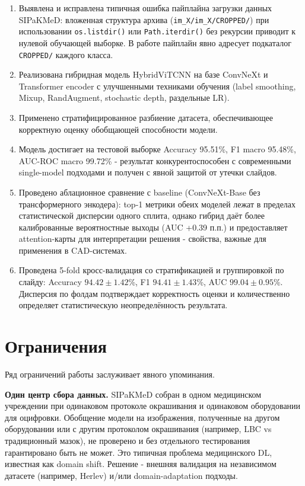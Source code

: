 \documentclass[14pt,a4paper]{extreport}
\begin{document}
\begin{enumerate}
    \item Выявлена и исправлена типичная ошибка пайплайна загрузки данных
          SIPaKMeD: вложенная структура архива (\texttt{im\_X/im\_X/CROPPED/})
          при использовании \texttt{os.listdir()} или \texttt{Path.iterdir()}
          без рекурсии приводит к нулевой обучающей выборке. В работе пайплайн
          явно адресует подкаталог \texttt{CROPPED/} каждого класса.
    \item Реализована гибридная модель HybridViTCNN на базе ConvNeXt и
          Transformer encoder с улучшенными техниками обучения (label
          smoothing, Mixup, RandAugment, stochastic depth, раздельные LR).
    \item Применено стратифицированное разбиение датасета, обеспечивающее
          корректную оценку обобщающей способности модели.
    \item Модель достигает на тестовой выборке Accuracy 95.51\%,
          F1 macro 95.48\%, AUC-ROC macro 99.72\% - результат
          конкурентоспособен с современными single-model подходами и
          получен с явной защитой от утечки слайдов.
    \item Проведено аблационное сравнение с baseline (ConvNeXt-Base без
          трансформерного энкодера): top-1 метрики обеих моделей лежат в
          пределах статистической дисперсии одного сплита, однако гибрид
          даёт более калиброванные вероятностные выходы (AUC +0.39 п.п.)
          и предоставляет attention-карты для интерпретации решения -
          свойства, важные для применения в CAD-системах.
    \item Проведена 5-fold кросс-валидация со стратификацией и
          группировкой по слайду: Accuracy $94.42 \pm 1.42$\%,
          F1 $94.41 \pm 1.43$\%, AUC $99.04 \pm 0.95$\%. Дисперсия по
          фолдам подтверждает корректность оценки и количественно
          определяет статистическую неопределённость результата.
\end{enumerate}

\section{Ограничения}

Ряд ограничений работы заслуживает явного упоминания.

\textbf{Один центр сбора данных.} SIPaKMeD собран в одном медицинском
учреждении при одинаковом протоколе окрашивания и одинаковом оборудовании
для оцифровки. Обобщение модели на изображения, полученные на другом
оборудовании или с другим протоколом окрашивания (например, LBC vs
традиционный мазок), не проверено и без отдельного тестирования
гарантировано быть не может. Это типичная проблема медицинского DL,
известная как domain shift. Решение - внешняя валидация на независимом
датасете (например, Herlev) и/или domain-adaptation подходы.
\end{document}
